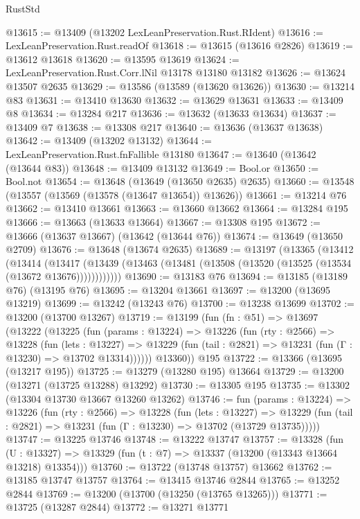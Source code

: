 \begin{lexlean}{RustStd}
\begin{coremodule}
@13615 := @13409 (@13202 LexLeanPreservation.Rust.RIdent)
@13616 := LexLeanPreservation.Rust.readOf
@13618 := @13615 (@13616 @2826)
@13619 := @13612 @13618
@13620 := @13595 @13619
@13624 := LexLeanPreservation.Rust.Corr.lNil @13178 @13180 @13182
@13626 := @13624 @13507 @2635
@13629 := @13586 (@13589 (@13620 @13626))
@13630 := @13214 @83
@13631 := @13410 @13630
@13632 := @13629 @13631
@13633 := @13409 @8
@13634 := @13284 @217
@13636 := @13632 (@13633 @13634)
@13637 := @13409 @7
@13638 := @13308 @217
@13640 := @13636 (@13637 @13638)
@13642 := @13409 (@13202 @13132)
@13644 := LexLeanPreservation.Rust.fnFallible @13180
@13647 := @13640 (@13642 (@13644 @83))
@13648 := @13409 @13132
@13649 := Bool.or
@13650 := Bool.not
@13654 := @13648 (@13649 (@13650 @2635) @2635)
@13660 := @13548 (@13557 (@13569 (@13578 (@13647 @13654)) @13626))
@13661 := @13214 @76
@13662 := @13410 @13661
@13663 := @13660 @13662
@13664 := @13284 @195
@13666 := @13663 (@13633 @13664)
@13667 := @13308 @195
@13672 := @13666 (@13637 @13667) (@13642 (@13644 @76))
@13674 := @13649 (@13650 @2709)
@13676 := @13648 (@13674 @2635)
@13689 := @13197
    (@13365
      (@13412
        (@13414
          (@13417 (@13439 (@13463 (@13481 (@13508 (@13520 (@13525 (@13534 (@13672 @13676))))))))))))
@13690 := @13183 @76
@13694 := @13185 (@13189 @76) (@13195 @76)
@13695 := @13204 @13661
@13697 := @13200 (@13695 @13219)
@13699 := @13242 (@13243 @76)
@13700 := @13238 @13699
@13702 := @13200 (@13700 @13267)
@13719 := @13199
    (fun (fn : @51) =>
    @13697
      (@13222
        (@13225
          (fun (params : @13224) =>
          @13226
            (fun (rty : @2566) =>
            @13228
              (fun (lets : @13227) =>
              @13229 (fun (tail : @2821) => @13231 (fun (Γ : @13230) => @13702 @13314))))))
        @13360))
    @195
@13722 := @13366 (@13695 (@13217 @195))
@13725 := @13279 (@13280 @195) @13664
@13729 := @13200 (@13271 (@13725 @13288) @13292)
@13730 := @13305 @195
@13735 := @13302 (@13304 @13730 @13667 @13260 @13262)
@13746 := fun (params : @13224) =>
  @13226
    (fun (rty : @2566) =>
    @13228
      (fun (lets : @13227) =>
      @13229 (fun (tail : @2821) => @13231 (fun (Γ : @13230) => @13702 (@13729 @13735)))))
@13747 := @13225 @13746
@13748 := @13222 @13747
@13757 := @13328
    (fun (U : @13327) => @13329 (fun (t : @7) => @13337 (@13200 (@13343 @13664 @13218) @13354)))
@13760 := @13722 (@13748 @13757) @13662
@13762 := @13185 @13747 @13757
@13764 := @13415 @13746 @2844
@13765 := @13252 @2844
@13769 := @13200 (@13700 (@13250 (@13765 @13265)))
@13771 := @13725 (@13287 @2844)
@13772 := @13271 @13771

\end{coremodule}
\end{lexlean}
